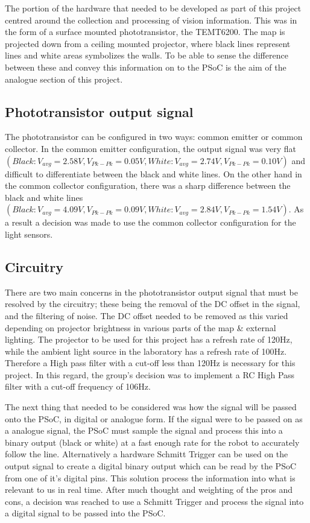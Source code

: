 \documentclass{article}
\begin{document}
The portion of the hardware that needed to be developed as part of this project centred around the collection and processing of vision information. This was in the form of a surface mounted phototransistor, the TEMT6200. The map is projected down from a ceiling mounted projector, where black lines represent lines and white areas symbolizes the walls. To be able to sense the difference between these and convey this information on to the PSoC is the aim of the analogue section of this project.

\subsection{Phototransistor output signal}

The phototransistor can be configured in two ways: common emitter or common collector. In the common emitter configuration, the output signal was very flat $(Black: V_{avg} = 2.58V, V_{Pk-Pk} = 0.05V, White: V_{avg} = 2.74V, V_{Pk-Pk} = 0.10V)$ and difficult to differentiate between the black and white lines. On the other hand in the common collector configuration, there was a sharp difference between the black and white lines $(Black: V_{avg} = 4.09V, V_{Pk-Pk} = 0.09V, White: V_{avg} = 2.84V, V_{Pk-Pk} = 1.54V)$. As a result a decision was made to use the common collector configuration for the light sensors.

\subsection{Circuitry}

There are two main concerns in the phototransistor output signal that must be resolved by the circuitry; these being the removal of the DC offset in the signal, and the filtering of noise. The DC offset needed to be removed as this varied depending on projector brightness in various parts of the map \& external lighting. The projector to be used for this project has a refresh rate of 120Hz, while the ambient light source in the laboratory has a refresh rate of 100Hz. Therefore a High pass filter with a cut-off less than 120Hz is necessary for this project. In this regard, the group's decision was to implement a RC High Pass filter with a cut-off frequency of 106Hz.

The next thing that needed to be considered was how the signal will be passed onto the PSoC, in digital or analogue form. If the signal were to be passed on as a analogue signal, the PSoC must sample the signal and process this into a binary output (black or white) at a fast enough rate for the robot to accurately follow the line. Alternatively a hardware Schmitt Trigger can be used on the output signal to create a digital binary output which can be read by the PSoC from one of it's digital pins. This solution process the information into what is relevant to us in real time. After much thought and weighting of the pros and cons, a decision was reached to  use a Schmitt Trigger and process the signal into a digital signal to be passed into the PSoC.
\end{document}
